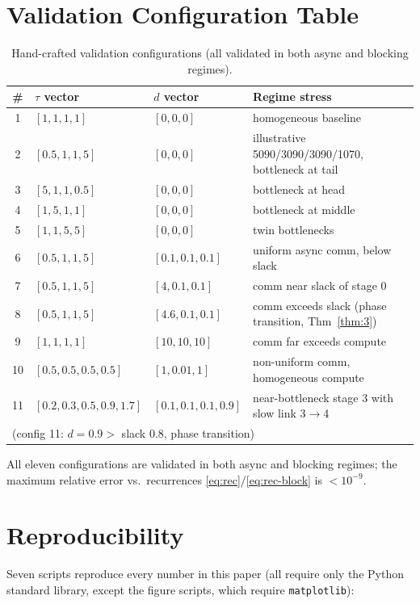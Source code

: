 \documentclass[11pt]{article}
\begin{document}
\section{Validation Configuration Table}\label{app:configs}

\begin{table}[htbp]
\centering
\caption{Hand-crafted validation configurations (all validated in both async and blocking regimes).}
\label{tab:configs}
\begin{tabular}{clll}
\toprule
\# & $\tau$ vector & $d$ vector & Regime stress \\
\midrule
1 & $[1,1,1,1]$ & $[0,0,0]$ & homogeneous baseline \\
2 & $[0.5,1,1,5]$ & $[0,0,0]$ & illustrative 5090/3090/3090/1070, bottleneck at tail \\
3 & $[5,1,1,0.5]$ & $[0,0,0]$ & bottleneck at head \\
4 & $[1,5,1,1]$ & $[0,0,0]$ & bottleneck at middle \\
5 & $[1,1,5,5]$ & $[0,0,0]$ & twin bottlenecks \\
6 & $[0.5,1,1,5]$ & $[0.1,0.1,0.1]$ & uniform async comm, below slack \\
7 & $[0.5,1,1,5]$ & $[4,0.1,0.1]$ & comm near slack of stage 0 \\
8 & $[0.5,1,1,5]$ & $[4.6,0.1,0.1]$ & comm exceeds slack (phase transition, Thm~\ref{thm:3}) \\
9 & $[1,1,1,1]$ & $[10,10,10]$ & comm far exceeds compute \\
10 & $[0.5,0.5,0.5,0.5]$ & $[1,0.01,1]$ & non-uniform comm, homogeneous compute \\
11 & $[0.2,0.3,0.5,0.9,1.7]$ & $[0.1,0.1,0.1,0.9]$ & near-bottleneck stage 3 with slow link 3$\to$4 \\
\multicolumn{4}{l}{\footnotesize (config 11: $d=0.9>$ slack $0.8$, phase transition)} \\
\bottomrule
\end{tabular}
\end{table}

All eleven configurations are validated in both async and blocking regimes; the maximum relative error vs.\ recurrences \eqref{eq:rec}/\eqref{eq:rec-block} is $<10^{-9}$.

\section{Reproducibility}\label{app:repro}

Seven scripts reproduce every number in this paper (all require only the Python standard library, except the figure scripts, which require \texttt{matplotlib}):
\end{document}
